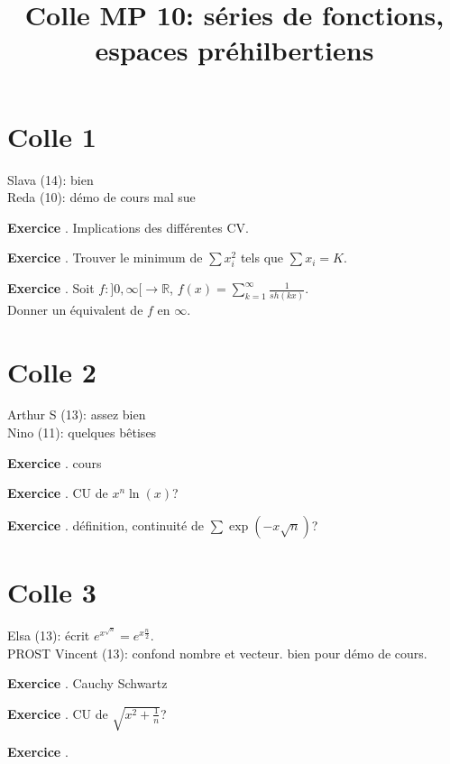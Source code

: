 \documentclass[10pt,a4paper]{article}
\title{Colle MP 10: séries de fonctions, espaces préhilbertiens}
\newcounter{question}
\newcounter{exo}
\newenvironment{exo}{\vspace{0.5cm}\setcounter{question}{0}\addtocounter{exo}{1} \noindent \textbf{Exercice \theexo}. \normalsize }{\par}
\begin{document}
	\maketitle
	
	\section*{Colle 1}
	Slava (14): bien\\
	Reda (10): démo de cours mal sue
		
	\begin{exo}
		Implications des différentes CV.
	\end{exo}

	\begin{exo}
		Trouver le minimum de $\sum x_i^2$ tels que $\sum x_i = K$.
	\end{exo}
	
	\begin{exo}
		Soit $f : ]0, \infty[ \longrightarrow \mathbb{R}$, $f(x) = \sum_{k=1}^{\infty}	\frac{1}{sh(kx)}$.\\
		Donner un équivalent de $f$ en $\infty$.
	\end{exo}
	
	\section*{Colle 2}
	\setcounter{exo}{0}
	Arthur S (13): assez bien\\
	Nino (11): quelques bêtises
	
	\begin{exo}
		cours
	\end{exo}

	\begin{exo}
		CU de $x^n \ln(x)$?
	\end{exo}
		
	\begin{exo}
		définition, continuité de $\sum \exp(-x\sqrt{n})$?
	\end{exo}

	\section*{Colle 3}
	\setcounter{exo}{0}
	Elsa (13): écrit $e^{x^{\sqrt{n}}} = e^{x\frac{n}{2}}$.\\
	PROST Vincent (13): confond nombre et vecteur. bien pour démo de cours.
	
	\begin{exo}
		Cauchy Schwartz
	\end{exo}

	\begin{exo}
		CU de $\sqrt{x^2 + \frac{1}{n}}$?
	\end{exo}
	
	\begin{exo}
		
	\end{exo}
	
\end{document}
